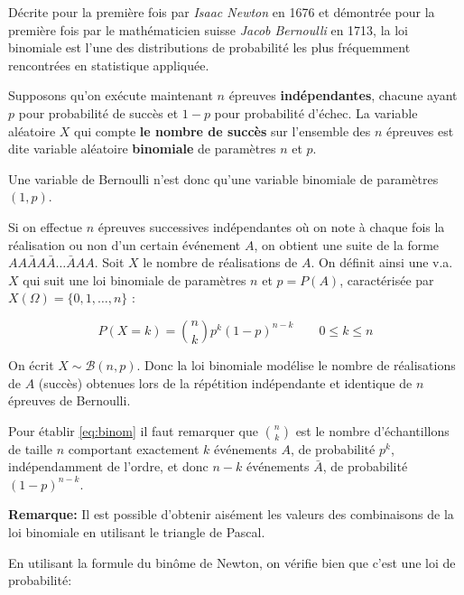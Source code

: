 \documentclass[]{book}
\theoremstyle{magentacolor}
\theoremstyle{proprie}
\theoremstyle{exstyle}
\theoremstyle{exostyle}
\theoremstyle{definition}
\theoremstyle{definition}
\theoremstyle{definition}
\theoremstyle{remark}
\let\BeginKnitrBlock\begin \let\EndKnitrBlock\end
\begin{document}
\BeginKnitrBlock{rmdtip}
Décrite pour la première fois par \emph{Isaac Newton} en 1676 et démontrée pour la première fois par le mathématicien suisse \emph{Jacob Bernoulli} en 1713, la loi binomiale est l'une des distributions de probabilité les plus fréquemment rencontrées en statistique appliquée.
\EndKnitrBlock{rmdtip}

Supposons qu'on exécute maintenant \(n\) épreuves \textbf{indépendantes},
chacune ayant \(p\) pour probabilité de succès et \(1-p\) pour probabilité
d'échec. La variable aléatoire \(X\) qui compte \textbf{le nombre de succès}
sur l'ensemble des \(n\) épreuves est dite variable aléatoire
\textbf{binomiale} de paramètres \(n\) et \(p\).

\BeginKnitrBlock{rmdinsight}
Une variable de Bernoulli n'est donc qu'une variable binomiale de paramètres \((1,p)\).
\EndKnitrBlock{rmdinsight}

\BeginKnitrBlock{definition}
\protect\hypertarget{def:unnamed-chunk-25}{}{\label{def:unnamed-chunk-25} }Si on effectue \(n\) épreuves successives indépendantes où on note à
chaque fois la réalisation ou non d'un certain événement \(A\), on obtient une suite de la forme \(AA\bar{A}A\bar{A}\ldots \bar{A}AA\). Soit \(X\) le nombre de réalisations de \(A\). On définit ainsi une v.a. \(X\) qui suit une loi binomiale de paramètres \(n\) et \(p=P(A)\), caractérisée par
\(X(\Omega)=\{0, 1,\ldots, n\}\) :

\begin{equation}
    P(X=k)=\binom{n}{k}p^k (1-p)^{n-k} \qquad 0\leq k \leq n
    \label{eq:binom}
\end{equation}

On écrit \(X \sim \mathcal{B} \left({n, p}\right)\). Donc la loi binomiale modélise le nombre de réalisations de \(A\) (succès) obtenues lors de la répétition indépendante et identique de \(n\) épreuves de Bernoulli.
\EndKnitrBlock{definition}

\BeginKnitrBlock{rmdinsight}
Pour établir \eqref{eq:binom} il faut remarquer que \(\binom{n}{k}\) est le nombre d'échantillons de taille \(n\) comportant exactement \(k\) événements \(A\), de probabilité \(p^k\), indépendamment de l'ordre, et donc \(n-k\) événements \(\bar{A}\), de probabilité \((1-p)^{n-k}\).
\EndKnitrBlock{rmdinsight}

\textbf{Remarque:} Il est possible d'obtenir aisément les valeurs des combinaisons de la loi binomiale en utilisant le triangle de Pascal.

En utilisant la formule du binôme de Newton, on vérifie
bien que c'est une loi de probabilité:
\end{document}
